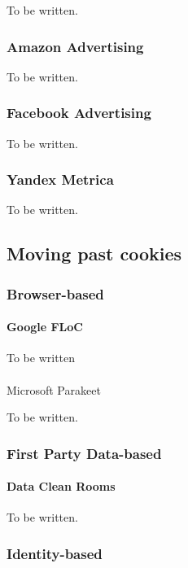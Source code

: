 To be written.

\subsubsection{Amazon Advertising}

To be written.

\subsubsection{Facebook Advertising}

To be written.

\subsubsection{Yandex Metrica}

To be written.

\subsection{Moving past cookies}

\subsubsection{Browser-based}

\paragraph{Google FLoC}

To be written

\paragraph{}{Microsoft Parakeet}

To be written.

\subsubsection{First Party Data-based}

\paragraph{Data Clean Rooms}

To be written.

\subsubsection{Identity-based}

